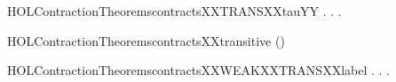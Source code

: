 \newcommand{\HOLContractionTheoremscontractsXXTRANSXXtau}{\UseVerbatim{HOLContractionTheoremscontractsXXTRANSXXtau}}
\begin{SaveVerbatim}{HOLContractionTheoremscontractsXXTRANSXXtauYY}
\HOLTokenTurnstile{} \HOLSymConst{\HOLTokenForall{}} .
          \HOLSymConst{\HOLTokenImp{}}
       \HOLSymConst{\HOLTokenForall{}}.  \HOLTokenTransBegin\HOLConst{\ensuremath{\tau}}\HOLTokenTransEnd {} \HOLSymConst{\HOLTokenImp{}} \HOLSymConst{\HOLTokenExists{}}.    \HOLSymConst{\HOLTokenConj{}}   
\end{SaveVerbatim}
\newcommand{\HOLContractionTheoremscontractsXXTRANSXXtauYY}{\UseVerbatim{HOLContractionTheoremscontractsXXTRANSXXtauYY}}
\begin{SaveVerbatim}{HOLContractionTheoremscontractsXXtransitive}
\HOLTokenTurnstile{}  ()
\end{SaveVerbatim}
\newcommand{\HOLContractionTheoremscontractsXXtransitive}{\UseVerbatim{HOLContractionTheoremscontractsXXtransitive}}
\begin{SaveVerbatim}{HOLContractionTheoremscontractsXXWEAKXXTRANSXXlabel}
\HOLTokenTurnstile{} \HOLSymConst{\HOLTokenForall{}} .
          \HOLSymConst{\HOLTokenImp{}}
       \HOLSymConst{\HOLTokenForall{}} .
            \HOLTokenWeakTransBegin{} \HOLTokenWeakTransEnd {} \HOLSymConst{\HOLTokenImp{}}
           \HOLSymConst{\HOLTokenExists{}}.  \HOLTokenWeakTransBegin{} \HOLTokenWeakTransEnd {} \HOLSymConst{\HOLTokenConj{}}   
\end{SaveVerbatim}
\newcommand{\HOLContractionTheoremscontractsXXWEAKXXTRANSXXlabel}{\UseVerbatim{HOLContractionTheoremscontractsXXWEAKXXTRANSXXlabel}}
